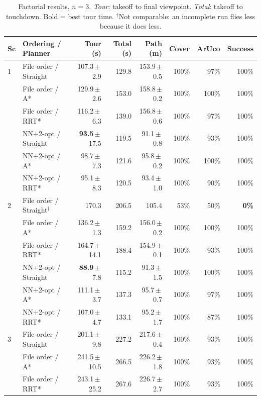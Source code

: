 \documentclass[11pt,a4paper]{article}
\begin{document}
\begin{table}[H]
\centering\footnotesize
\caption{Factorial results, $n=3$. \emph{Tour}: takeoff to final viewpoint. \emph{Total}: takeoff to touchdown. Bold = best tour time. $^\dagger$Not comparable: an incomplete run flies less because it does less.}
\label{tab:results}
\begin{tabular}{llrrrrrr}
\toprule
\textbf{Sc} & \textbf{Ordering / Planner} & \textbf{Tour (s)} & \textbf{Total (s)} & \textbf{Path (m)} & \textbf{Cover} & \textbf{ArUco} & \textbf{Success} \\
\midrule
1 & File order / Straight & 107.3\,$\pm$\,2.9 & 129.8 & 153.9\,$\pm$\,0.5 & 100\% & 97\% & 100\% \\
  & File order / A*       & 129.9\,$\pm$\,2.6 & 153.0 & 158.8\,$\pm$\,0.2 & 100\% & 100\% & 100\% \\
  & File order / RRT*     & 116.2\,$\pm$\,6.3 & 139.0 & 156.8\,$\pm$\,0.6 & 100\% & 97\% & 100\% \\
  & NN+2-opt / Straight   & \textbf{93.5}\,$\pm$\,17.5 & 119.5 & 91.1\,$\pm$\,0.8 & 100\% & 93\% & 100\% \\
  & NN+2-opt / A*         & 98.7\,$\pm$\,7.3 & 121.6 & 95.8\,$\pm$\,0.2 & 100\% & 100\% & 100\% \\
  & NN+2-opt / RRT*       & 95.1\,$\pm$\,8.3 & 120.5 & 93.4\,$\pm$\,1.0 & 100\% & 90\% & 100\% \\
\midrule
2 & File order / Straight$^\dagger$ & 170.3 & 206.5 & 105.4 & 53\% & 50\% & \textbf{0\%} \\
  & File order / A*       & 136.2\,$\pm$\,1.3 & 159.2 & 156.0\,$\pm$\,0.2 & 100\% & 100\% & 100\% \\
  & File order / RRT*     & 164.7\,$\pm$\,14.1 & 188.4 & 154.9\,$\pm$\,0.1 & 100\% & 93\% & 100\% \\
  & NN+2-opt / Straight   & \textbf{88.9}\,$\pm$\,7.8 & 115.2 & 91.3\,$\pm$\,1.5 & 100\% & 100\% & 100\% \\
  & NN+2-opt / A*         & 111.1\,$\pm$\,3.7 & 137.3 & 95.7\,$\pm$\,0.7 & 100\% & 97\% & 100\% \\
  & NN+2-opt / RRT*       & 107.0\,$\pm$\,4.7 & 133.1 & 95.2\,$\pm$\,1.7 & 100\% & 87\% & 100\% \\
\midrule
3 & File order / Straight & 201.1\,$\pm$\,9.8 & 227.2 & 217.6\,$\pm$\,0.4 & 100\% & 93\% & 100\% \\
  & File order / A*       & 241.5\,$\pm$\,10.5 & 266.5 & 226.2\,$\pm$\,1.8 & 100\% & 93\% & 100\% \\
  & File order / RRT*     & 243.1\,$\pm$\,25.2 & 267.6 & 226.7\,$\pm$\,2.7 & 100\% & 93\% & 100\% \\

\end{tabular}
\end{table}
\end{document}
